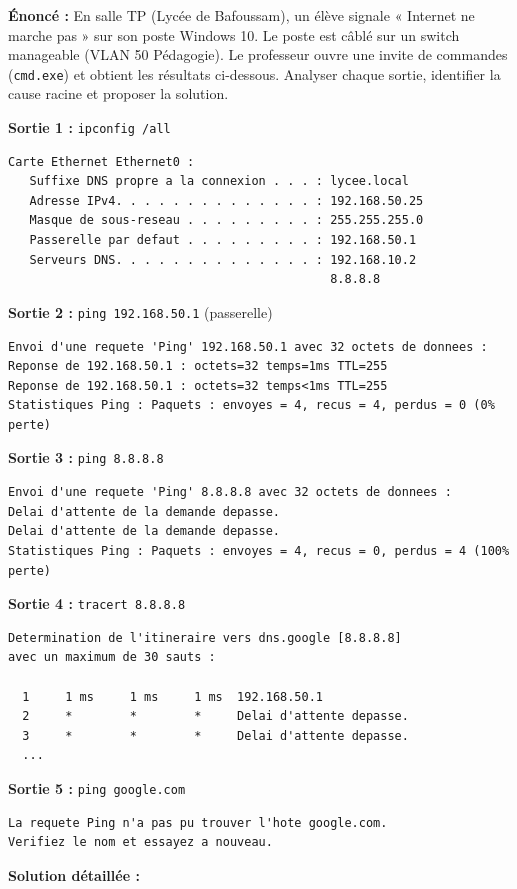 \documentclass[11pt]{article}
\begin{document}
\begin{exoresolu}
\textbf{Énoncé :} En salle TP (Lycée de Bafoussam), un élève signale « Internet ne marche pas » sur son poste Windows 10. Le poste est câblé sur un switch manageable (VLAN 50 Pédagogie). Le professeur ouvre une invite de commandes (\texttt{cmd.exe}) et obtient les résultats ci-dessous. Analyser chaque sortie, identifier la cause racine et proposer la solution.

\textbf{Sortie 1 :} \texttt{ipconfig /all}
\begin{lstlisting}
Carte Ethernet Ethernet0 :
   Suffixe DNS propre a la connexion . . . : lycee.local
   Adresse IPv4. . . . . . . . . . . . . . : 192.168.50.25
   Masque de sous-reseau . . . . . . . . . : 255.255.255.0
   Passerelle par defaut . . . . . . . . . : 192.168.50.1
   Serveurs DNS. . . . . . . . . . . . . . : 192.168.10.2
                                             8.8.8.8
\end{lstlisting}

\textbf{Sortie 2 :} \texttt{ping 192.168.50.1} (passerelle)
\begin{lstlisting}
Envoi d'une requete 'Ping' 192.168.50.1 avec 32 octets de donnees :
Reponse de 192.168.50.1 : octets=32 temps=1ms TTL=255
Reponse de 192.168.50.1 : octets=32 temps<1ms TTL=255
Statistiques Ping : Paquets : envoyes = 4, recus = 4, perdus = 0 (0% perte)
\end{lstlisting}

\textbf{Sortie 3 :} \texttt{ping 8.8.8.8}
\begin{lstlisting}
Envoi d'une requete 'Ping' 8.8.8.8 avec 32 octets de donnees :
Delai d'attente de la demande depasse.
Delai d'attente de la demande depasse.
Statistiques Ping : Paquets : envoyes = 4, recus = 0, perdus = 4 (100% perte)
\end{lstlisting}

\textbf{Sortie 4 :} \texttt{tracert 8.8.8.8}
\begin{lstlisting}
Determination de l'itineraire vers dns.google [8.8.8.8]
avec un maximum de 30 sauts :

  1     1 ms     1 ms     1 ms  192.168.50.1
  2     *        *        *     Delai d'attente depasse.
  3     *        *        *     Delai d'attente depasse.
  ...
\end{lstlisting}

\textbf{Sortie 5 :} \texttt{ping google.com}
\begin{lstlisting}
La requete Ping n'a pas pu trouver l'hote google.com.
Verifiez le nom et essayez a nouveau.
\end{lstlisting}
\tcblower
\textbf{Solution détaillée :}


\end{exoresolu}
\end{document}
